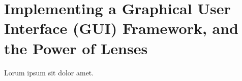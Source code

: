 \section{Implementing a Graphical User Interface (GUI) Framework, and the Power of Lenses}
\label{sec:gui}

Lorum ipsum sit dolor amet.  \lipsum[2-4]